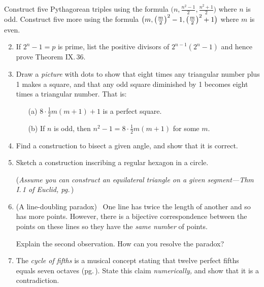 \begin{exercises}{}{}
	\exstart %
	Construct five Pythagorean triples using the formula $\bigl(n,\frac{n^2-1}2,\frac{n^2+1}2\bigr)$ where $n$ is odd. Construct five more using the formula $\bigl(m,\left(\frac{m}{2}\right)^2-1,\left(\frac{m}{2}\right)^2+1\bigr)$ where $m$ is even.%
	
	\begin{enumerate}\setcounter{enumi}{1}
	  \item If $2^n-1=p$ is prime, list the positive divisors of $2^{n-1}(2^n-1)$ and hence prove Theorem IX.\,36.
	  
	  \item%
	  Draw a \emph{picture} with dots to show that eight times any triangular number plus 1 makes a square, and that any odd square diminished by 1 becomes eight times a triangular number. That is:
	  \begin{enumerate}
	    \item[(a)] $8\cdot\frac 12m(m+1)+1$ is a perfect square.
	    \item[(b)] If $n$ is odd, then $n^2-1=8\cdot\frac 12m(m+1)$ for some $m$.
	  \end{enumerate}
	  
	  \item%
	  Find a construction to bisect a given angle, and show that it is correct.
	 
	  \item%
	  Sketch a construction inscribing a regular hexagon in a circle.\par
	  (\emph{Assume you can construct an equilateral triangle on a given segment---Thm I.\,1 of Euclid, pg.\,\pageref{pg:euclidI1}})
	  
		\item (A line-doubling paradox) \ One line has twice the length of another and so has more points. However, there is a bijective correspondence between the points on these lines so they have the \emph{same number} of points.\par
		Explain the second observation. How can you resolve the paradox?
	
	
		\item The \emph{cycle of fifths} is a musical concept stating that twelve perfect fifths equals seven octaves (pg.\,\pageref{pg:pythagtuning}). State this claim \emph{numerically,} and show that it is a contradiction.%
	  

\end{enumerate}
\end{exercises}
